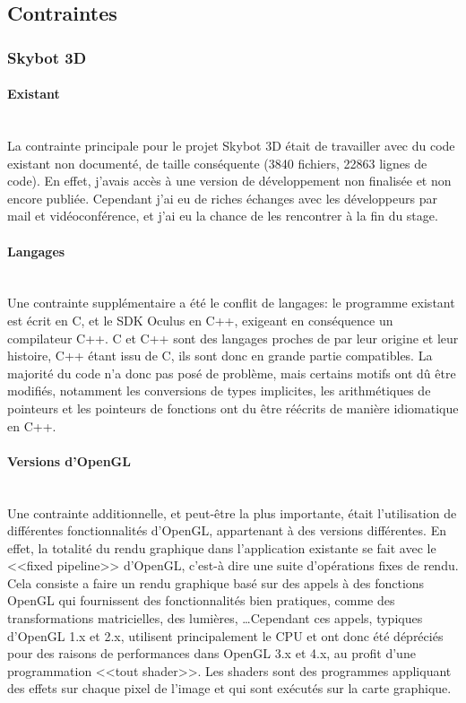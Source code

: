 \documentclass[a4paper,french,12pt]{article}
\begin{document}
	
				

	\subsection{Contraintes}

	\subsubsection{Skybot 3D}
	    \paragraph{Existant} ~\\

		La contrainte principale pour le projet Skybot 3D était de travailler avec du code existant non documenté,
		de taille conséquente (3840 fichiers, 22863 lignes de code).
		En effet, j'avais accès à une version de développement non finalisée et non encore publiée. Cependant j'ai
		eu de riches échanges avec les développeurs par mail et vidéoconférence, et j'ai eu la chance
		de les rencontrer à la fin du stage.

	    \paragraph{Langages} ~\\

		Une contrainte supplémentaire a été le conflit de langages: le programme existant est écrit en C, et le
		SDK Oculus en C++, exigeant en conséquence un compilateur C++.
		C et C++ sont des langages proches de par leur origine et leur histoire, C++ étant issu de C,
		ils sont donc en grande partie compatibles. La majorité du code n'a donc pas posé de problème,
		mais certains motifs ont dû être modifiés, notamment les conversions de types implicites,
		les arithmétiques de pointeurs et les pointeurs de fonctions ont du être réécrits de manière
		idiomatique en C++.

	    \paragraph{Versions d'OpenGL} ~\\

		Une contrainte additionnelle, et peut-être la plus importante, était l'utilisation de différentes
		fonctionnalités d'OpenGL, appartenant à des versions différentes.
		En effet, la totalité du rendu graphique dans l'application existante se fait avec le <<fixed pipeline>>
		d'OpenGL, c'est-à dire une suite d'opérations fixes de rendu. Cela consiste a faire un rendu graphique basé sur des
		appels à des fonctions OpenGL qui fournissent des fonctionnalités bien pratiques, comme des transformations
		matricielles, des lumières, \ldots Cependant ces appels, typiques d'OpenGL 1.x et 2.x,
		utilisent principalement le CPU et ont donc
		été dépréciés pour des raisons de performances dans OpenGL 3.x et 4.x, au profit d'une programmation
		<<tout shader>>. Les shaders sont des programmes appliquant des effets sur chaque pixel de l'image et qui
		sont exécutés sur la carte graphique.
\end{document}
